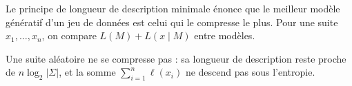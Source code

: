 Le principe de longueur de description minimale énonce que le meilleur modèle génératif d'un jeu de
données est celui qui le compresse le plus. Pour une suite $x_1, \dots, x_n$, on compare
$L(M) + L(x \mid M)$ entre modèles.

Une suite aléatoire ne se compresse pas : sa longueur de description reste proche de $n \log_2 |\Sigma|$,
et la somme $\sum_{i=1}^{n} \ell(x_i)$ ne descend pas sous l'entropie.
